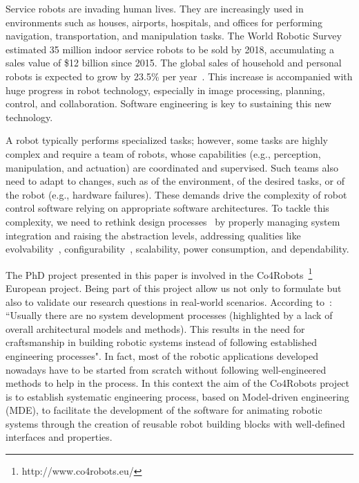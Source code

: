 Service robots are invading human lives. They are increasingly used in environments such as houses, airports, hospitals, and offices for performing navigation, transportation, and manipulation tasks. 
The World Robotic Survey~\cite{wrs:online} estimated 35 million indoor service robots to be sold by 2018, accumulating a sales value of \$12 billion since 2015. 
The global sales of household and personal robots is expected to grow by 23.5\% per year~\cite{sheng:online}. 
This increase is accompanied with huge progress in robot technology, especially in image processing, planning, control, and collaboration. Software engineering is key to sustaining this new technology.

A robot typically performs specialized tasks; however, some tasks are highly complex and require a team of robots, whose capabilities (e.g., perception, manipulation, and actuation) are coordinated and supervised. 
Such teams also need to adapt to changes, such as of the environment, of the desired tasks, or of the robot (e.g., hardware failures). 
These demands drive the complexity of robot control software relying on appropriate software architectures. 
To tackle this complexity, we need to rethink design processes~\cite{Lee2008} by properly managing system integration and raising the abstraction levels, addressing qualities like evolvability~\cite{Perez2008}, configurability~\cite{Gamez2013563}, scalability, power consumption, and dependability.

The PhD project presented in this paper is involved in the Co4Robots~\footnote{http://www.co4robots.eu/} European project.
Being part of this project allow us not only to formulate but also to validate our research questions in real-world scenarios.
According to~\cite{roadmap}: ``Usually there are no system development processes (highlighted by a lack of overall architectural models and methods). 
This results in the need for craftsmanship in building robotic systems instead of following established engineering processes".
In fact, most of the robotic applications developed nowadays have to be started from scratch without following well-engineered methods to help in the process.
In this context the aim of the Co4Robots project is to establish systematic engineering process, based on Model-driven engineering (MDE), to facilitate the development of the software for animating robotic systems through the creation of reusable robot building blocks with well-defined interfaces and properties. 


